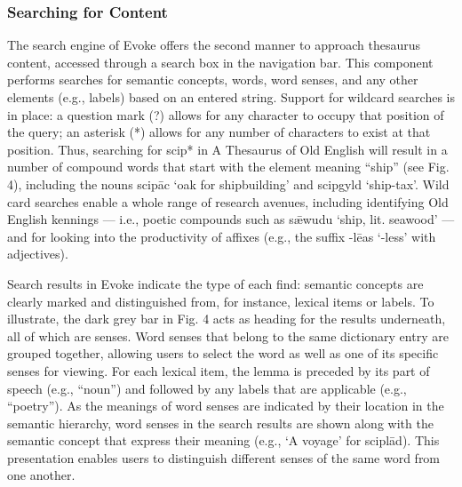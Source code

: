 \subsubsection{Searching for Content}
The search engine of Evoke offers the second manner to approach thesaurus content, accessed through a search box in the navigation bar. This component performs searches for semantic concepts, words, word senses, and any other elements (e.g., labels) based on an entered string. Support for wildcard searches is in place: a question mark (?) allows for any character to occupy that position of the query; an asterisk (*) allows for any number of characters to exist at that position. Thus, searching for scip* in A Thesaurus of Old English will result in a number of compound words that start with the element meaning “ship” (see Fig. 4), including the nouns scipāc ‘oak for shipbuilding’ and scipgyld ‘ship-tax’. Wild card searches enable a whole range of research avenues, including identifying Old English kennings — i.e., poetic compounds such as sǣwudu ‘ship, lit. seawood’ — and for looking into the productivity of affixes (e.g., the suffix -lēas ‘-less’ with adjectives).

Search results in Evoke indicate the type of each find: semantic concepts are clearly marked and distinguished from, for instance, lexical items or labels. To illustrate, the dark grey bar in Fig. 4 acts as heading for the results underneath, all of which are senses. Word senses that belong to the same dictionary entry are grouped together, allowing users to select the word as well as one of its specific senses for viewing. For each lexical item, the lemma is preceded by its part of speech (e.g., “noun”) and followed by any labels that are applicable (e.g., “poetry”). As the meanings of word senses are indicated by their location in the semantic hierarchy, word senses in the search results are shown along with the semantic concept that express their meaning (e.g., ‘A voyage’ for sciplād). This presentation enables users to distinguish different senses of the same word from one another.

